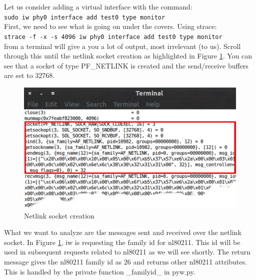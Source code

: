 \documentclass[11pt]{article}
\begin{document}
Let us consider adding a virtual interface with the command:\\

    \texttt{sudo iw phy0 interface add test0 type monitor}\\
    
First, we need to see what is going on under the covers. Using strace:\\

    \texttt{strace -f -x -s 4096 iw phy0 interface add test0 type monitor}\\  

from a terminal will give a you a lot of output, most irrelevant (to us). Scroll
through this until the netlink socket creation as highlighted in Figure
\ref{fig:nlsock}. You can see that a socket of type PF\_NETLINK is created and
the send/receive buffers are set to 32768.
\begin{center}
\begin{figure}[h]
\includegraphics{nlsock}
\caption{Netlink socket creation}
\label{fig:nlsock}
\end{figure}
\end{center} 
What we want to analyze are the messages sent and received over the netlink 
socket. In Figure \ref{fig:nlsock}, iw is requesting the family id for nl80211. 
This id will be used in subsequent requests related to nl80211 as we will see 
shortly. The return message gives the nl80211 family id as 26 and returns other
nl80211 attributes. This is handled by the private function \_familyid\_ in 
pyw.py.
\end{document}
